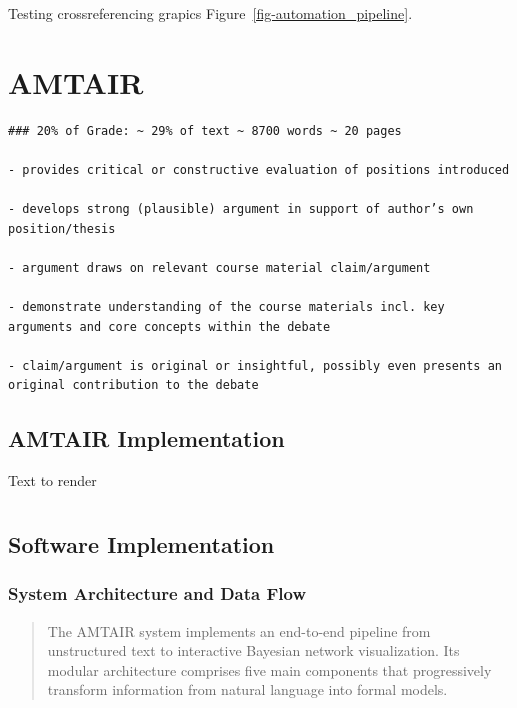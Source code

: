 \documentclass[]{book}
\begin{document}
Testing crossreferencing grapics Figure~\ref{fig-automation_pipeline}.


\chapter{AMTAIR}\label{amtair}

\begin{verbatim}
### 20% of Grade: ~ 29% of text ~ 8700 words ~ 20 pages

- provides critical or constructive evaluation of positions introduced

- develops strong (plausible) argument in support of author’s own position/thesis

- argument draws on relevant course material claim/argument

- demonstrate understanding of the course materials incl. key arguments and core concepts within the debate

- claim/argument is original or insightful, possibly even presents an original contribution to the debate 
\end{verbatim}

\section{AMTAIR Implementation}\label{sec-amtair-implementation}

Text to render


\chapter{}\label{section}

\section{Software Implementation}\label{software-implementation}

\subsection{System Architecture and Data
Flow}\label{system-architecture-and-data-flow}

\begin{quote}
The AMTAIR system implements an end-to-end pipeline from unstructured
text to interactive Bayesian network visualization. Its modular
architecture comprises five main components that progressively transform
information from natural language into formal models.
\end{quote}
\end{document}
